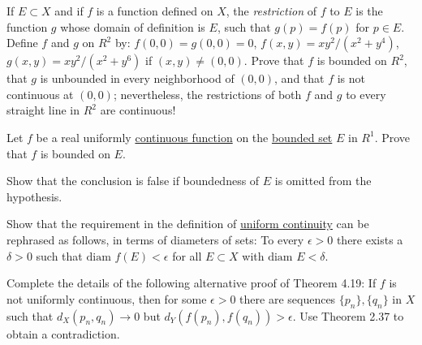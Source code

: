  \begin{exercise}[Rudin 4.7]
    If $E \subset X$ and if $f$ is a function defined on $X$, the \textit{restriction} of $f$ to $E$ is the function $g$ whose domain of definition is $E$, such that $g(p) = f(p)$ for $p \in E$. Define $f$ and $g$ on $R^2$ by: $f(0, 0) = g(0, 0) = 0$, $f(x, y) = xy^2 / (x^2 + y^4)$, $g(x, y) = xy^2 / (x^2 + y^6)$ if $(x, y) \neq (0, 0)$. Prove that $f$ is bounded on $R^2$, that $g$ is unbounded in every neighborhood of $(0, 0)$, and that $f$ is not continuous at $(0, 0)$; nevertheless, the restrictions of both $f$ and $g$ to every straight line in $R^2$ are continuous!
  \end{exercise}
  \begin{solution}

  \end{solution}

  \begin{exercise}[Rudin 4.8]
    Let $f$ be a real uniformly \hyperref[pst-def:continuous_func]{continuous function} on the \hyperref[pst-def:bounded-set]{bounded set} $E$ in $R^1$. Prove that $f$ is bounded on $E$.
    \par Show that the conclusion is false if boundedness of $E$ is omitted from the hypothesis.
  \end{exercise}
  \begin{solution}

  \end{solution}

  \begin{exercise}[Rudin 4.9]
    Show that the requirement in the definition of \hyperref[def:uniform-continuity]{uniform continuity} can be rephrased as follows, in terms of diameters of sets: To every $\epsilon > 0$ there exists a $\delta > 0$ such that $\text{diam } f(E) < \epsilon$ for all $E \subset X$ with $\text{diam } E < \delta$.
  \end{exercise}
  \begin{solution}

  \end{solution}

  \begin{exercise}[Rudin 4.10]
    Complete the details of the following alternative proof of Theorem 4.19: If $f$ is not uniformly continuous, then for some $\epsilon > 0$ there are sequences $\{p_n\}, \{q_n\}$ in $X$ such that $d_X(p_n, q_n) \to 0$ but $d_Y(f(p_n), f(q_n)) > \epsilon$. Use Theorem 2.37 to obtain a contradiction.
  \end{exercise}
  \begin{solution}

  \end{solution}

